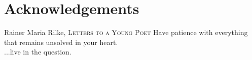 
\bigskip

\begingroup
\let\clearpage\relax
\let\cleardoublepage\relax
\let\cleardoublepage\relax

\chapter*{Acknowledgements}

\begin{chapquote}{Rainer Maria Rilke, \textsc{Letters to a Young Poet}}
Have patience with everything that remains unsolved in your heart. \\
...live in the question.
\end{chapquote}

\endgroup
